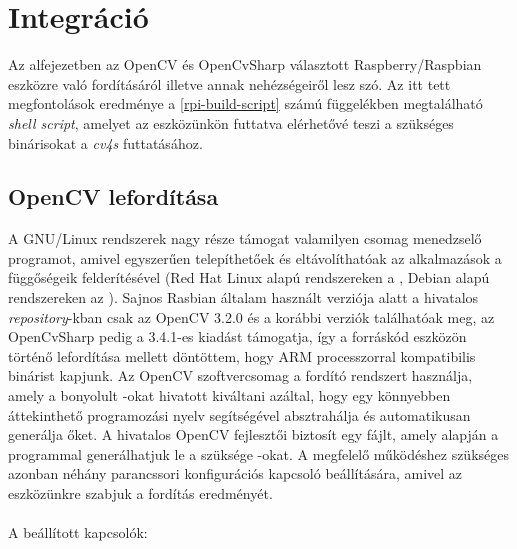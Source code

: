 \section{Integráció}

Az alfejezetben az OpenCV és OpenCvSharp választott Raspberry/Raspbian eszközre való fordításáról illetve annak nehézségeiről lesz szó. Az itt tett megfontolások eredménye a \ref{rpi-build-script} számú függelékben megtalálható \emph{shell script}, amelyet az eszközünkön futtatva elérhetővé teszi a szükséges binárisokat a \emph{cv4s} futtatásához.

\subsection{OpenCV lefordítása}

A GNU/Linux rendszerek nagy része támogat valamilyen csomag menedzselő programot, amivel egyszerűen telepíthetőek és eltávolíthatóak az alkalmazások a függőségeik felderítésével (Red Hat Linux alapú rendszereken a , Debian alapú rendszereken az ). Sajnos  Rasbian általam használt verziója alatt a hivatalos \emph{repository}-kban csak az OpenCV 3.2.0 és a korábbi verziók találhatóak meg, az OpenCvSharp pedig a 3.4.1-es kiadást támogatja, így a forráskód eszközön történő lefordítása mellett döntöttem, hogy ARM processzorral kompatibilis binárist kapjunk. Az OpenCV szoftvercsomag a  fordító rendszert használja, amely a bonyolult -okat hivatott kiváltani azáltal, hogy egy könnyebben áttekinthető programozási nyelv segítségével absztrahálja és automatikusan generálja őket.
A hivatalos OpenCV fejlesztői  biztosít egy  fájlt, amely alapján a  programmal generálhatjuk le a szüksége -okat.\cite{opencv} A megfelelő működéshez szükséges azonban néhány parancssori konfigurációs kapcsoló beállítására, amivel az eszközünkre szabjuk a fordítás eredményét.\\
\\
A beállított kapcsolók:
